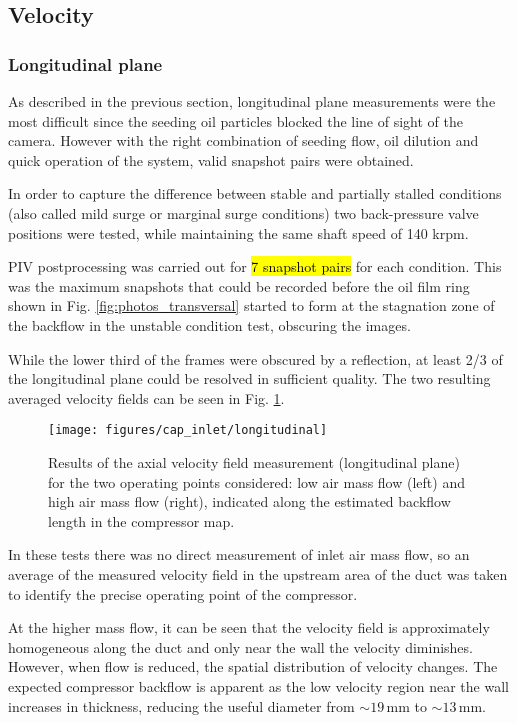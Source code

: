 \subsection{Velocity}
\label{sub:velocity}

\subsubsection{Longitudinal plane}

As described in the previous section, longitudinal plane measurements were the most difficult since the seeding oil particles blocked the line of sight of the camera. However with the right combination of seeding flow, oil dilution and quick operation of the system, valid snapshot pairs were obtained.

In order to capture the difference between stable and partially stalled conditions (also called mild surge or marginal surge conditions) two back-pressure valve positions were tested, while maintaining the same shaft speed of 140 krpm.

PIV postprocessing was carried out for \hl{7 snapshot pairs} for each condition. This was the maximum snapshots that could be recorded before the oil film ring shown in Fig. \ref{fig:photos_transversal} started to form at the stagnation zone of the backflow in the unstable condition test, obscuring the images. 

While the lower third of the frames were obscured by a reflection, at least 2/3 of the longitudinal plane could be resolved in sufficient quality. The two resulting averaged velocity fields can be seen in Fig. \ref{fig:longitudinal}.

\begin{figure}[t!]
\hspace{-0.1\textwidth}
\texttt{[image: figures/cap\_inlet/longitudinal]}
\caption{Results of the axial velocity field measurement (longitudinal plane) for the two operating points considered: low air mass flow (left) and high air mass flow (right), indicated along the estimated backflow length in the compressor map.}
\label{fig:longitudinal}
\end{figure}

In these tests there was no direct measurement of inlet air mass flow, so an average of the measured velocity field in the upstream area of the duct was taken to identify the precise operating point of the compressor.

At the higher mass flow, it can be seen that the velocity field is approximately homogeneous along the duct and only near the wall the velocity diminishes. However, when flow is reduced, the spatial distribution of velocity changes. The expected compressor backflow is apparent as the low velocity region near the wall increases in thickness, reducing the useful diameter from $\sim 19\,$mm to $\sim 13\,$mm. 

